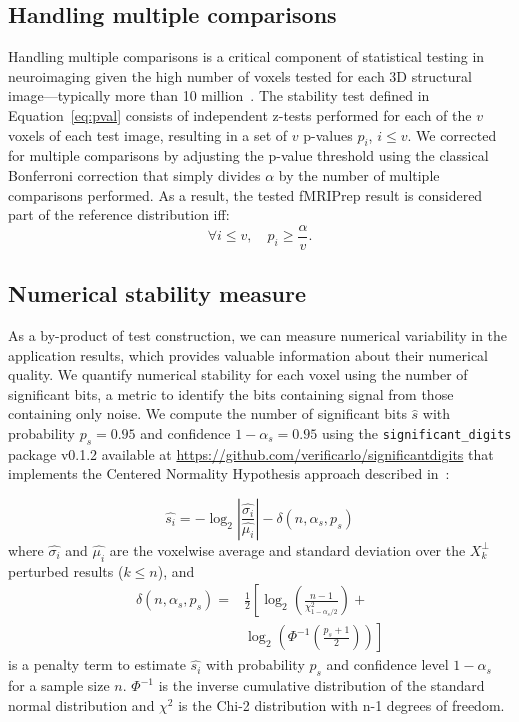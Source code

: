 \documentclass[lettersize,journal]{IEEEtran}
\newcommand{\fmriprep}{fMRIPrep\xspace}
\begin{document}
\subsection{Handling multiple comparisons}

Handling multiple comparisons is a critical component of statistical testing in neuroimaging given the high number of voxels tested for each 3D structural image---typically more than 10 million~\cite{NICHOLS2007246}. The stability test defined in Equation~\ref{eq:pval} consists of independent z-tests performed for each of the $v$ voxels of each test image, resulting in a set of $v$ p-values $p_i$, $i \leq v$. We corrected for multiple comparisons by adjusting the p-value threshold using the classical Bonferroni correction that simply divides $\alpha$ by the number of multiple comparisons performed. As a result, the tested \fmriprep result is considered part of the reference distribution iff:
\begin{equation}
  \label{eq:bonferroni}
  \forall i \leq v, \quad p_i \geq \frac{\alpha}{v}.
\end{equation}

\subsection{Numerical stability measure}

As a by-product of test construction, we can measure numerical variability in the application results, which provides valuable information about their numerical quality.
We quantify numerical stability for each voxel using the number of significant bits, a metric to identify the bits containing signal from those containing only noise. We compute the number of significant bits $\hat{s}$ with probability $p_s=0.95$ and confidence $1-\alpha_s=0.95$ using the \texttt{significant\_digits} package v0.1.2 available at \url{https://github.com/verificarlo/significantdigits} that implements the Centered Normality Hypothesis approach described in~\cite{sohier2021confidence}:

\[
  \hat{s_i} = -\log_2 \left| \frac{\hat{\sigma_i}}{\hat{\mu_i}} \right| - \delta(n, \alpha_s, p_s)
\]
where $\hat{\sigma_i}$ and $\hat{\mu_i}$ are the voxelwise average and standard deviation over the $X_k^\perp$ perturbed results ($k \leq n$), and
\begin{equation}
  \begin{split}
    \delta(n, \alpha_s, p_s) =& \frac{1}{2} \left[ \log_2 \left( \frac{n-1}{\chi^2_{1-\alpha_s/2}} \right) + \right. \\
      &  \left. \log_2 \left( \Phi^{-1} \left( \frac{p_s+1}{2} \right) \right) \right]
  \end{split}
\end{equation}
is a penalty term to estimate $\hat{s_i}$ with probability $p_s$ and confidence level $1-\alpha_s$ for a sample size $n$. $\Phi^{-1}$ is the inverse cumulative distribution of the standard normal distribution and $\chi^2$ is the Chi-2 distribution with n-1 degrees of freedom.
\end{document}

